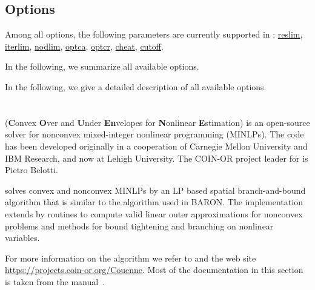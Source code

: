 
\subsection{Options}

Among all \CBC options, the following \GAMS parameters are currently supported in \CBC:
\hyperlink{reslim}{reslim}, \hyperlink{iterlim}{iterlim}, \hyperlink{nodlim}{nodlim}, \hyperlink{optca}{optca}, \hyperlink{optcr}{optcr}, \hyperlink{increment}{cheat}, \hyperlink{cutoff}{cutoff}.

In the following, we summarize all available \CBC options.

In the following, we give a detailed description of all available \CBC options.

\section{\COUENNE}


\COUENNE (\textbf{C}onvex \textbf{O}ver and \textbf{U}nder \textbf{En}velopes for \textbf{N}onlinear \textbf{E}stimation) is an open-source solver for nonconvex mixed-integer nonlinear programming (MINLPs).
The code has been developed originally in a cooperation of Carnegie Mellon University and IBM Research, and now at Lehigh University.
The COIN-OR project leader for \COUENNE is Pietro Belotti.

\COUENNE solves convex and nonconvex MINLPs by an LP based spatial branch-and-bound algorithm that is similar to the algorithm used in \textsc{BARON}.
The implementation extends \BONMIN by routines to compute valid linear outer approximations for nonconvex problems and methods for bound tightening and branching on nonlinear variables.

For more information on the algorithm we refer to \cite{Be09,BeLeLiMaWa08} and the \COUENNE web site \url{https://projects.coin-or.org/Couenne}.
Most of the \COUENNE documentation in this section is taken from the \COUENNE manual~\cite{CouenneManual}.

